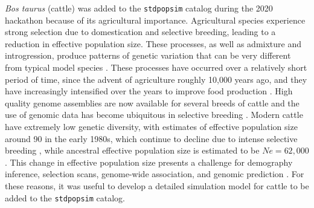 \documentclass[hidelinks]{article}
\newcommand{\stdpopsim}{\texttt{stdpopsim}\xspace}
\begin{document}
\emph{Bos taurus} (cattle) was added to the \stdpopsim catalog during the 2020 hackathon because of its agricultural importance. Agricultural species experience
strong selection due to domestication and selective breeding, leading
to a reduction in effective population size. These processes,
as well as admixture and introgression, produce patterns
of genetic variation that can be very different from typical model
species \citep{Larson2013}. These processes have occurred over a
relatively short period of time, since the advent of agriculture roughly 10,000 years ago, and they have increasingly intensified over the years to improve food production \citep{Gaut2018,MacLeod2013}. High quality genome assemblies are now
available for several breeds of cattle \citep[e.g.,][]{Rosen2020, Heaton2021,
Talenti2022} and the use of genomic data has become ubiquitous
in selective breeding \citep{Meuwissen2001,
MacLeod2014, Obsteter2021, Cesarani2022}. Modern cattle have extremely low genetic diversity,
with estimates of effective population size around 90 in the early 1980s, which continue to decline due to intense selective breeding \citep{MacLeod2013, VanRaden2020, Makanjouloa2020}, while ancestral effective population size is estimated to be $Ne=62,000$ \citep{MacLeod2013}. This change in effective population size presents a challenge for demography inference, selection scans, genome-wide association, and genomic prediction
\citep{MacLeod2013,MacLeod2014,Hartfield2022}. For these reasons, it was useful to develop a detailed simulation model for cattle to be added to the \stdpopsim catalog.
\end{document}
